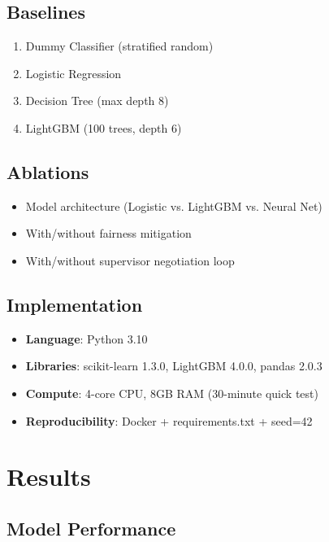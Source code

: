 \documentclass[11pt]{article}
\begin{document}
\subsection{Baselines}

\begin{enumerate}
    \item Dummy Classifier (stratified random)
    \item Logistic Regression
    \item Decision Tree (max depth 8)
    \item LightGBM (100 trees, depth 6)
\end{enumerate}

\subsection{Ablations}

\begin{itemize}
    \item Model architecture (Logistic vs. LightGBM vs. Neural Net)
    \item With/without fairness mitigation
    \item With/without supervisor negotiation loop
\end{itemize}

\subsection{Implementation}

\begin{itemize}
    \item \textbf{Language}: Python 3.10
    \item \textbf{Libraries}: scikit-learn 1.3.0, LightGBM 4.0.0, pandas 2.0.3
    \item \textbf{Compute}: 4-core CPU, 8GB RAM (30-minute quick test)
    \item \textbf{Reproducibility}: Docker + requirements.txt + seed=42
\end{itemize}

\section{Results}

\subsection{Model Performance}
\end{document}
